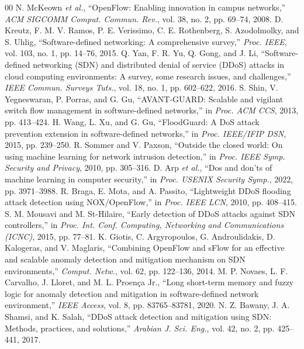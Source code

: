\documentclass[conference]{IEEEtran}
\begin{document}
\begin{thebibliography}{00}
 N. McKeown \emph{et al.}, ``OpenFlow: Enabling innovation in campus networks,'' \emph{ACM SIGCOMM Comput. Commun. Rev.}, vol. 38, no. 2, pp. 69--74, 2008.
 D. Kreutz, F. M. V. Ramos, P. E. Verissimo, C. E. Rothenberg, S. Azodolmolky, and S. Uhlig, ``Software-defined networking: A comprehensive survey,'' \emph{Proc. IEEE}, vol. 103, no. 1, pp. 14--76, 2015.
 Q. Yan, F. R. Yu, Q. Gong, and J. Li, ``Software-defined networking (SDN) and distributed denial of service (DDoS) attacks in cloud computing environments: A survey, some research issues, and challenges,'' \emph{IEEE Commun. Surveys Tuts.}, vol. 18, no. 1, pp. 602--622, 2016.
 S. Shin, V. Yegneswaran, P. Porras, and G. Gu, ``AVANT-GUARD: Scalable and vigilant switch flow management in software-defined networks,'' in \emph{Proc. ACM CCS}, 2013, pp. 413--424.
 H. Wang, L. Xu, and G. Gu, ``FloodGuard: A DoS attack prevention extension in software-defined networks,'' in \emph{Proc. IEEE/IFIP DSN}, 2015, pp. 239--250.
 R. Sommer and V. Paxson, ``Outside the closed world: On using machine learning for network intrusion detection,'' in \emph{Proc. IEEE Symp. Security and Privacy}, 2010, pp. 305--316.
 D. Arp \emph{et al.}, ``Dos and don'ts of machine learning in computer security,'' in \emph{Proc. USENIX Security Symp.}, 2022, pp. 3971--3988.
 R. Braga, E. Mota, and A. Passito, ``Lightweight DDoS flooding attack detection using NOX/OpenFlow,'' in \emph{Proc. IEEE LCN}, 2010, pp. 408--415.
 S. M. Mousavi and M. St-Hilaire, ``Early detection of DDoS attacks against SDN controllers,'' in \emph{Proc. Int. Conf. Computing, Networking and Communications (ICNC)}, 2015, pp. 77--81.
 K. Giotis, C. Argyropoulos, G. Androulidakis, D. Kalogeras, and V. Maglaris, ``Combining OpenFlow and sFlow for an effective and scalable anomaly detection and mitigation mechanism on SDN environments,'' \emph{Comput. Netw.}, vol. 62, pp. 122--136, 2014.
 M. P. Novaes, L. F. Carvalho, J. Lloret, and M. L. Proen\c{c}a Jr., ``Long short-term memory and fuzzy logic for anomaly detection and mitigation in software-defined network environment,'' \emph{IEEE Access}, vol. 8, pp. 83765--83781, 2020.
 N. Z. Bawany, J. A. Shamsi, and K. Salah, ``DDoS attack detection and mitigation using SDN: Methods, practices, and solutions,'' \emph{Arabian J. Sci. Eng.}, vol. 42, no. 2, pp. 425--441, 2017.

\end{thebibliography}
\end{document}
